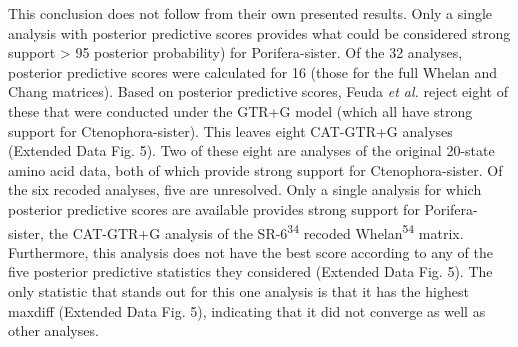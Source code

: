 \documentclass[]{article}
\begin{document}
This conclusion does not follow from their own presented results. Only a
single analysis with posterior predictive scores provides what could be
considered strong support \textgreater{} 95 posterior probability) for
Porifera-sister. Of the 32 analyses, posterior predictive scores were
calculated for 16 (those for the full Whelan and Chang matrices). Based
on posterior predictive scores, Feuda \emph{et al.} reject eight of
these that were conducted under the GTR+G model (which all have strong
support for Ctenophora-sister). This leaves eight CAT-GTR+G analyses
(Extended Data Fig. 5). Two of these eight are analyses of the original
20-state amino acid data, both of which provide strong support for
Ctenophora-sister. Of the six recoded analyses, five are unresolved.
Only a single analysis for which posterior predictive scores are
available provides strong support for Porifera-sister, the CAT-GTR+G
analysis of the SR-6\textsuperscript{34} recoded
Whelan\textsuperscript{54} matrix. Furthermore, this analysis does not
have the best score according to any of the five posterior predictive
statistics they considered (Extended Data Fig. 5). The only statistic
that stands out for this one analysis is that it has the highest maxdiff
(Extended Data Fig. 5), indicating that it did not converge as well as
other analyses.
\end{document}
